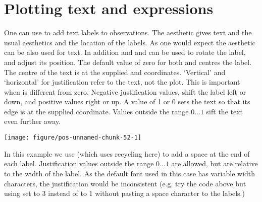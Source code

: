 \documentclass[paper=a4,10pt,div=17,headsepline,BCOR=12mm,twoside,open=right]{scrbook}\usepackage{knitr}
\begin{document}
\section{Plotting text and expressions}

One can use  to add text labels to observations. The aesthetic  gives text and the usual aesthetics  and  the location of the labels. As one would expect the  aesthetic can be also used for text. In addition  and  and  can be used to rotate the label, and adjust its position. The default value of zero for both  and  centres the label. The centre of the text is at the supplied  and  coordinates. `Vertical' and `horizontal' for justification refer to the text, not the plot. This is important when  is different from zero. Negative justification values, shift the label left or down, and positive values right or up. A value of 1 or 0 sets the text so that its edge is at the supplied coordinate. Values outside the range $0\ldots 1$ sift the text even further away.

\begin{knitrout}\footnotesize
{}\color{fgcolor}\begin{kframe}
\begin{alltt}
 \hlkwb{<-}
  \hlstd{(}\hlstd{=}\hlopt{:}\hlstd{,} \hlstd{=}\hlstd{(}\hlstd{,} \hlstd{),}
             \hlstd{=}\hlstd{(letters[}\hlopt{:}\hlstd{],} \hlstd{))}

  \hlopt{+}
  \hlstd{(}\hlstd{=}\hlstd{,} \hlstd{=}\hlstd{)} \hlopt{+} \hlstd{()}
\end{alltt}
\end{kframe}

{\centering \texttt{[image: figure/pos-unnamed-chunk-52-1]} 

}



\end{knitrout}

In this example we use  (which uses recycling here) to add a space at the end of each label. Justification values outside the range $0\ldots 1$ are allowed, but are relative to the width of the label. As the default font used in this case has variable width characters, the justification would be inconsistent (e.g. try the code above but using  set to 3 instead of to 1 without pasting a space character to the labels.)
\end{document}
